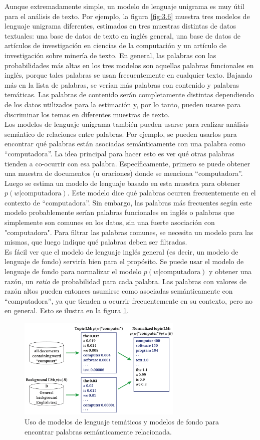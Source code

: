 Aunque extremadamente simple, un modelo de lenguaje unigrama es muy útil para el análisis de texto. Por ejemplo, la figura \ref{fig:3.6} muestra tres modelos de lenguaje unigrama diferentes, estimados en tres muestras distintas de datos textuales: una base de datos de texto en inglés general, una base de datos de artículos de investigación en ciencias de la computación y un artículo de investigación sobre minería de texto. En general, las palabras con las probabilidades más altas en los tres modelos son aquellas palabras funcionales en inglés, porque tales palabras se usan frecuentemente en cualquier texto. Bajando más en la lista de palabras, se verían más palabras con contenido y palabras temáticas. Las palabras de contenido serán completamente distintas dependiendo de los datos utilizados para la estimación y, por lo tanto, pueden usarse para discriminar los temas en diferentes muestras de texto. \\

Los modelos de lenguaje unigrama también pueden usarse para realizar análisis semántico de relaciones entre palabras. Por ejemplo, se pueden usarlos para encontrar qué palabras están asociadas semánticamente con una palabra como ``computadora''. La idea principal para hacer esto es ver qué otras palabras tienden a co-ocurrir con esa palabra. Específicamente, primero se puede obtener una muestra de documentos (u oraciones) donde se menciona ``computadora''. Luego se estima un modelo de lenguaje basado en esta muestra para obtener $p(w | \text{computadora})$. Este modelo dice qué palabras ocurren frecuentemente en el contexto de ``computadora''. Sin embargo, las palabras más frecuentes según este modelo probablemente serían palabras funcionales en inglés o palabras que simplemente son comunes en los datos, sin una fuerte asociación con "computadora". Para filtrar las palabras comunes, se necesita un modelo para las mismas, que luego indique qué palabras deben ser filtradas. \\

Es fácil ver que el modelo de lenguaje inglés general (es decir, un modelo de lenguaje de fondo) serviría bien para el propósito. Se puede usar el modelo de lenguaje de fondo para normalizar el modelo $p(w | \text{computadora})$ y obtener una razón, un \textit{ratio} de probabilidad para cada palabra. Las palabras con valores de razón altos pueden entonces asumirse como asociadas semánticamente con ``computadora'', ya que tienden a ocurrir frecuentemente en su contexto, pero no en general. Esto se ilustra en la figura \ref{fig:3.7}.

\begin{figure}[h]
\centering
\includegraphics[width=0.7\textwidth]{fotos/11.png}
\caption{Uso de modelos de lenguaje temáticos y modelos de fondo para encontrar palabras semánticamente relacionada.}
\label{fig:3.7}
\end{figure}
